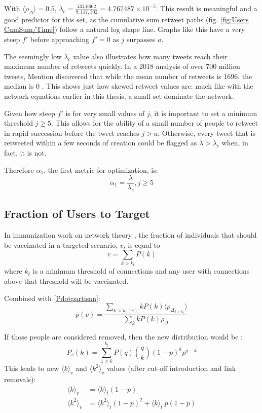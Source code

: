 \documentclass[NETN,manuscript]{stjour-new}
\begin{document}
With $\langle \rho_{\Delta} \rangle = 0.5$, $\lambda_c = \frac{434.6662}{9,117,302}=4.767487\times 10^{-5}$. This result is meaningful and a good predictor for this set, as the cumulative sum retweet paths (fig. \ref{fig:Users CumSum/Time}) follow a natural log shape line. Graphs like this have a very steep $f'$ before approaching $f' = 0$ as $j$ surpasses $a$. 

The seemingly low $\lambda_c$ value also illustrates how many tweets reach their maximum number of retweets quickly. In a 2018 analysis of over 700 million tweets, Mention discovered that while the mean number of retweets is 1696, the median is 0 \citep{mention2018twitter}. This shows just how skewed retweet values are: much like with the network equations earlier in this thesis, a small set dominate the network.

Given how steep $f'$ is for very small values of $j$, it is important to set a minimum threshold $j \geq 5$. This allows for the ability of a small number of people to retweet in rapid succession before the tweet reaches $j > a$. Otherwise, every tweet that is retweeted within a few seconds of creation could be flagged as $\lambda > \lambda_c$ when, in fact, it is not.

Therefore $\alpha_1$, the first metric for optimization, is:
\begin{equation}
    \label{alpha1}
    \alpha_1 = \frac{\lambda}{\lambda_c}, j\geq 5
\end{equation}

\subsection{Fraction of Users to Target}
In immunization work on network theory \citep{pastor2002immunization}, the fraction of individuals that should be vaccinated in a targeted scenario, $v$, is equal to 
\begin{equation}
    v = \sum_{k > k_t}P(k)
\end{equation}
where $k_t$ is a minimum threshold of connections and any user with connections above that threshold will be vaccinated. 

Combined with \ref{Pdotpartisan}:
\begin{equation}
\label{probability of vaccinated}
p(v) = \frac{\sum_{k>k_t(v)}kP(k)\langle \rho_{\Delta_{k>k_t}}\rangle}{\sum_{k}kP(k)\rho_{\Delta}}
\end{equation}

If those people are considered removed, then the new distribution would be \citep{cohen2001breakdown}:
\begin{equation}
    P_v(k) = \sum_{1\geq k}^{k_t}P(q)\binom{q}{k}(1-p)^kp^{q-k}
\end{equation}
This leads to new $\langle k \rangle_v$ and $\langle k^2 \rangle_v$ values (after cut-off introduction and link removals)\citep{pastor2002immunization}: 
\begin{align*}
        \langle k \rangle_v &= \langle k \rangle_t(1-p)\\
         \langle k^2 \rangle_v &= \langle k^2 \rangle_t(1-p)^2+\langle k \rangle_t\ p(1-p)
\end{align*}
\end{document}

